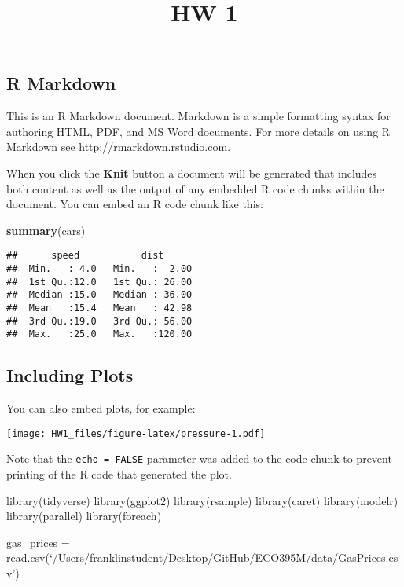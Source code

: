 \documentclass[
]{article}
\title{HW 1}
\author{}
\date{\vspace{-2.5em}}
\newenvironment{Shaded}{\begin{snugshade}}{\end{snugshade}}
\newcommand{\KeywordTok}[1]{\textcolor[rgb]{0.13,0.29,0.53}{\textbf{#1}}}
\newcommand{\NormalTok}[1]{#1}
\begin{document}
\maketitle

\hypertarget{r-markdown}{%
\subsection{R Markdown}\label{r-markdown}}

This is an R Markdown document. Markdown is a simple formatting syntax
for authoring HTML, PDF, and MS Word documents. For more details on
using R Markdown see \url{http://rmarkdown.rstudio.com}.

When you click the \textbf{Knit} button a document will be generated
that includes both content as well as the output of any embedded R code
chunks within the document. You can embed an R code chunk like this:

\begin{Shaded}
\begin{Highlighting}[]
\KeywordTok{summary}\NormalTok{(cars)}
\end{Highlighting}
\end{Shaded}

\begin{verbatim}
##      speed           dist       
##  Min.   : 4.0   Min.   :  2.00  
##  1st Qu.:12.0   1st Qu.: 26.00  
##  Median :15.0   Median : 36.00  
##  Mean   :15.4   Mean   : 42.98  
##  3rd Qu.:19.0   3rd Qu.: 56.00  
##  Max.   :25.0   Max.   :120.00
\end{verbatim}

\hypertarget{including-plots}{%
\subsection{Including Plots}\label{including-plots}}

You can also embed plots, for example:

\texttt{[image: HW1\_files/figure-latex/pressure-1.pdf]}

Note that the \texttt{echo\ =\ FALSE} parameter was added to the code
chunk to prevent printing of the R code that generated the plot.

library(tidyverse) library(ggplot2) library(rsample) library(caret)
library(modelr) library(parallel) library(foreach)

gas\_prices =
read.csv(`/Users/franklinstudent/Desktop/GitHub/ECO395M/data/GasPrices.csv')
\end{document}
